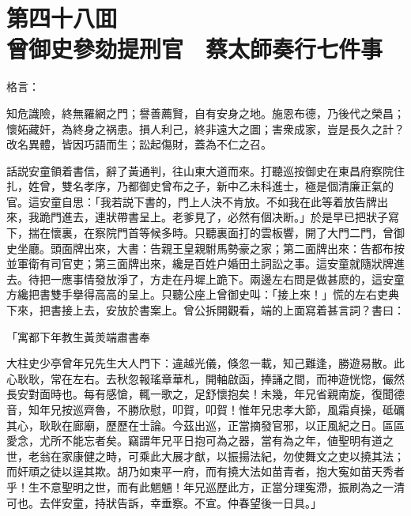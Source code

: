 
\chapter*{第四十八囬　\\曾御史參劾提刑官　蔡太師奏行七件事}


格言：

\begin{myquote}
知危識險，終無羅網之門；譽善薦賢，自有安身之地。施恩布德，乃後代之榮昌；懷妬藏奸，為終身之祸患。損人利己，終非遠大之圖；害衆成家，豈是長久之計？改名異體，皆因巧語而生；訟起傷財，蓋為不仁之召。
\end{myquote}

話説安童領着書信，辭了黃通判，往山東大道而來。打聽巡按御史在東昌府察院住扎，姓曾，雙名孝序，乃都御史曾布之子，新中乙未科進士，極是個清廉正氣的官。這安童自思：「我若説下書的，門上人決不肯放。不如我在此等着放告牌出來，我跪門進去，連狀帶書呈上。老爹見了，必然有個决断。」於是早已把狀子寫下，揣在懷裏，在察院門首等候多時。只聽裏面打的雲板響，開了大門二門，曾御史坐廳。頭面牌出來，大書：告親王皇親駙馬勢豪之家；第二面牌出來：告都布按並軍衛有司官吏；第三面牌出來，纔是百姓户婚田土詞訟之事。這安童就隨狀牌進去。待把一應事情發放淨了，方走在丹墀上跪下。兩邊左右問是做甚麽的，這安童方纔把書雙手擧得高高的呈上。只聽公座上曾御史叫：「接上來！」慌的左右吏典下來，把書接上去，安放於書案上。曾公拆開觀看，端的上面寫着甚言詞？書曰：

\begin{myquote}[\markfont]
\hspace*{2em}「寓都下年教生黃羙端肅書奉

大柱史少亭曾年兄先生大人門下：違越光儀，倏忽一載，知己難逢，勝遊易散。此心耿耿，常在左右。去秋忽報瑤章華札，開軸啟函，捧誦之間，而神遊恍惚，儼然長安對面時也。每有感愴，輒一歌之，足舒懷抱矣！未幾，年兄省親南旋，復聞德音，知年兄按巡齊魯，不勝欣慰，叩賀，叩賀！惟年兄忠孝大節，風霜貞操，砥礪其心，耿耿在廊廟，歷歷在士論。今茲出巡，正當摘發官邪，以正風紀之日。區區愛念，尤所不能忘者矣。竊謂年兄平日抱可為之器，當有為之年，値聖明有道之世，老翁在家康健之時，可乘此大展才猷，以振揚法紀，勿使舞文之吏以撓其法；而奸頑之徒以逞其欺。胡乃如東平一府，而有撓大法如苗青者，抱大寃如苗天秀者乎！生不意聖明之世，而有此魍魎！年兄巡歷此方，正當分理寃滯，振刷為之一清可也。去伴安童，持狀告訴，幸垂察。不宣。仲春望後一日具。」
\end{myquote}

